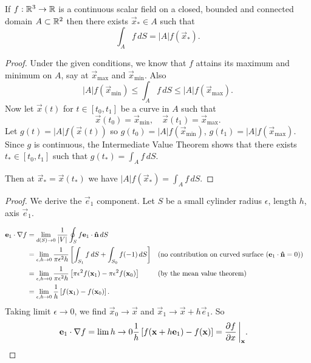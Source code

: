 \documentclass[10pt, a4paper]{article}
\begin{document}
\begin{lemma}
    If $f : \R ^ 3 \to \R$ is a continuous scalar field on a closed,
    bounded and connected domain $A \subset \R ^ 2$ then there exists $\vec{x}_{*} \in A$ such that
    \[
    \int_{A}f\,dS = |A|f(\vec{x}_{*}).
    \]

    \begin{proof}
        Under the given conditions,
        we know that $f$ attains its maximum and minimum on $A$,
        say at $\vec{x}_{\text{max}}$ and $\vec{x}_{\text{min}}$.
        Also
        \[
        |A|f(\vec{x}_{\text{min}}) \leq \int_{A}f\,dS \leq |A|f(\vec{x}_{\text{max}}).
        \]
        Now let $\vec{x}(t)$ for $t \in [t_0, t_1]$ be a curve in $A$ such that
        \[
        \vec{x}(t_0) = \vec{x}_{\text{min}},\quad\vec{x}(t_1) = \vec{x}_{\text{max}}.
        \]
        Let $g(t) = |A|f(\vec{x}(t))$ so $g(t_0) = |A|f(\vec{x}_{\text{min}})$,
        $g(t_1) = |A|f(\vec{x}_{\text{max}})$.
        Since $g$ is continuous,
        the Intermediate Value Theorem shows that there exists $t_{*} \in [t_0, t_1]$ such that $g(t_{*}) = \int_{A}f\,dS$.

        Then at $\vec{x}_{*} = \vec{x}(t_{*})$ we have $|A|f(\vec{x}_{*}) = \int_{A}f\,dS$.
    \end{proof}
\end{lemma}

\begin{proposition}[continues = mathmethII:prop:gradincart]
    \begin{proof}
        We derive the $\vec{e}_1$ component.
        Let $S$ be a small cylinder radius $\epsilon$,
        length $h$,
        axis $\vec{e}_1$.

        \begin{align*}
            \vec{e}_1 \cdot \bnabla f &= \lim_{d(S) \to 0}\frac{1}{|V|}\oint_{S}f\vec{e}_1\cdot\hvec{n}\,dS \\
            &= \lim_{\epsilon, h \to 0}\frac{1}{\pi \epsilon ^ 2h}\left[\int_{S_1}f\,dS + \int_{S_0}f(-1)\,dS\right]&&(\text{no contribution on curved surface $(\vec{e}_1 \cdot \hvec{n} = 0$)}) \\
            &= \lim_{\epsilon, h \to 0}\frac{1}{\pi \epsilon ^ 2 h}\left[\pi\epsilon ^ 2 f(\vec{x}_1) - \pi\epsilon ^ 2f(\vec{x}_0)\right] &&(\text{by the mean value theorem}) \\
            &= \lim_{\epsilon, h \to 0}\frac{1}{h}\left[f(\vec{x}_1) - f(\vec{x}_0)\right].
        \end{align*}
        Taking limit $\epsilon \to 0$,
        we find $\vec{x}_0 \to \vec{x}$ and $\vec{x}_1 \to \vec{x} + h\vec{e}_1$.
        So
        \begin{align*}
            \vec{e}_1 \cdot \bnabla f &= \lim{h \to 0}\frac{1}{h}\left[f(\vec{x} + h\vec{e}_1) - f(\vec{x})\right] = \pd[f]{x}\,\biggr|_{\vec{x}}.
        \end{align*}
    \end{proof}
\end{proposition}
\end{document}

